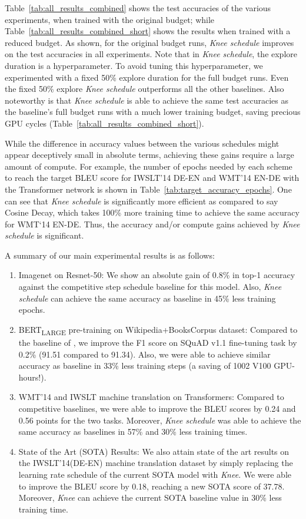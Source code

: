 \documentclass[twoside,11pt]{article}
\newcommand{\lrschedule}{\textit{Knee schedule}}
\newcommand{\lrscheduleshort}{\textit{Knee}}
\begin{document}
Table~\ref{tab:all_results_combined} shows the test accuracies of the various experiments, when trained with the original budget; while Table~\ref{tab:all_results_combined_short} shows the results when trained with a reduced budget. As shown, for the original budget runs, \lrschedule{} improves on the test accuracies in all experiments.  Note that in \lrschedule{}, the explore duration is a hyperparameter. To avoid tuning this hyperparameter, we experimented with a fixed 50\% explore duration for the full budget runs. Even the fixed 50\% explore \lrschedule{} outperforms all the other baselines. Also noteworthy is that \lrschedule{} is able to achieve the same test accuracies as the baseline's full budget runs with a much lower training budget, saving precious GPU cycles (Table~\ref{tab:all_results_combined_short}). 



While the difference in accuracy values between the various schedules might appear deceptively small in absolute terms, achieving these gains require a large amount of compute. For example, 
the number of epochs needed by each scheme to reach the target BLEU score for IWSLT'14 DE-EN and WMT'14 EN-DE with the Transformer network is shown in Table~\ref{tab:target_accuracy_epochs}. One can see that \lrschedule{} is significantly more efficient as compared to say Cosine Decay, which takes 100\% more training time to achieve the same accuracy for WMT`14 EN-DE. Thus, the accuracy and/or compute gains achieved by \lrschedule{} is significant.

A summary of our main experimental results is as follows:
\begin{enumerate}\item Imagenet on Resnet-50: We show an absolute gain of 0.8\% in top-1 accuracy against the competitive step schedule baseline for this model. Also, \lrschedule{} can achieve the same accuracy as baseline in 45\% less training epochs.
\item BERT\textsubscript{LARGE} pre-training on  Wikipedia+BooksCorpus dataset: Compared to the baseline of \cite{bert76lamb}, we improve the F1 score on SQuAD v1.1 fine-tuning task by 0.2\% (91.51 compared to 91.34). Also, we were able to achieve similar accuracy as baseline in 33\% less training steps (a saving of 1002 V100 GPU-hours!).
 \item WMT'14 and IWSLT machine translation on Transformers: Compared to competitive baselines, we were able to improve the BLEU scores by 0.24 and 0.56 points for the two tasks. Moreover, \lrschedule{} was able to achieve the same accuracy as baselines in 57\% and 30\% less training times.
 \item State of the Art (SOTA) Results: We also attain state of the art results on the IWSLT'14(DE-EN) machine translation dataset by simply replacing the learning rate schedule of the current SOTA model \citep{shen2020simple} with \lrscheduleshort{}. We were able to improve the BLEU score by 0.18, reaching a new SOTA score of 37.78. Moreover, \lrscheduleshort{} can achieve the current SOTA baseline value in 30\% less training time.
\end{enumerate}
\end{document}
